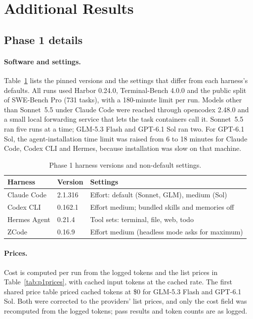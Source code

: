 \section{Additional Results}
\raggedbottom %
\subsection{Phase 1 details}
\label{app:p1}

\paragraph{Software and settings.}
Table~\ref{tab:p1versions} lists the pinned versions and the settings that differ from each harness's defaults.
All runs used Harbor 0.24.0, Terminal-Bench 4.0.0 and the public split of SWE-Bench Pro (731 tasks), with a
180-minute limit per run. Models other than Sonnet~5.5 under Claude Code were reached through opencodex 2.48.0
and a small local forwarding service that lets the task containers call it. Sonnet~5.5 ran five runs at a time;
GLM-5.3 Flash and GPT-6.1 Sol ran two. For GPT-6.1 Sol, the agent-installation time limit was raised from 6 to
18 minutes for Claude Code, Codex CLI and Hermes, because installation was slow on that machine.

\begin{table}[!h]
\centering\small
\caption{Phase 1 harness versions and non-default settings.}
\label{tab:p1versions}
\begin{tabular}{@{}llp{}@{}}
\toprule
Harness & Version & Settings\\
\midrule
Claude Code & 2.1.316 & Effort: default (Sonnet, GLM), medium (Sol)\\
Codex CLI & 0.162.1 & Effort medium; bundled skills and memories off\\
Hermes Agent & 0.21.4 & Tool sets: terminal, file, web, todo\\
ZCode & 0.16.9 & Effort medium (headless mode asks for maximum)\\
\bottomrule
\end{tabular}
\end{table}

\paragraph{Prices.}
Cost is computed per run from the logged tokens and the list prices in Table~\ref{tab:p1prices}, with cached
input tokens at the cached rate. The first shared price table priced cached tokens at \$0 for GLM-5.3 Flash and
GPT-6.1 Sol. Both were corrected to the providers' list prices, and only the cost field was recomputed from the
logged tokens; pass results and token counts are as logged.

